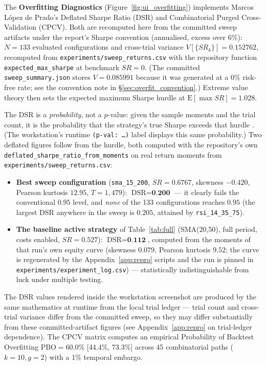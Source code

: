 \documentclass[12pt,a4paper,oneside]{report}
\begin{document}
The \textbf{Overfitting Diagnostics} (Figure~\ref{fig:ui_overfitting}) implements Marcos L{\'o}pez de Prado's Deflated Sharpe Ratio (DSR) and Combinatorial Purged Cross-Validation (CPCV). Both are recomputed here from the committed sweep artifacts under the report's Sharpe convention (annualised, excess over 6\%): $N = 133$ evaluated configurations and cross-trial variance $V[\{SR_k\}] = 0.152762$, recomputed from \texttt{experiments/\allowbreak sweep\_returns.csv} with the repository function \texttt{expected\_max\_sharpe} at benchmark $SR = 0$. (The committed \texttt{sweep\_summary.json} stores $V = 0.085991$ because it was generated at a 0\% risk-free rate; see the convention note in \S\ref{sec:overfit_convention}.) Extreme value theory then sets the expected maximum Sharpe hurdle at $\text{E}[\max SR] = 1.028$. \par
The DSR is a \emph{probability}, not a $p$-value: given the sample moments and the trial count, it is the probability that the strategy's true Sharpe exceeds that hurdle \cite{bailey2014}. (The workstation's runtime \texttt{(p-val:\,\ldots)} label displays this same probability.) Two deflated figures follow from the hurdle, both computed with the repository's own \texttt{deflated\_sharpe\_ratio\_from\_moments} on real return moments from \texttt{experiments/sweep\_returns.csv}:

\begin{itemize}[leftmargin=1.2cm]
    \item \textbf{Best sweep configuration} (\texttt{sma\_15\_200}, $SR = 0.6767$, skewness $-0.420$, Pearson kurtosis $12.95$, $T = 1{,}479$): $\text{DSR} = \textbf{0.200}$ --- it clearly fails the conventional $0.95$ level, and \emph{none} of the 133 configurations reaches $0.95$ (the largest DSR anywhere in the sweep is $0.205$, attained by \texttt{rsi\_14\_35\_75}).
    \item \textbf{The baseline active strategy} of Table~\ref{tab:full} (SMA(20,50), full period, costs enabled, $SR = 0.527$): $\text{DSR} = \textbf{0.112}$, computed from the moments of that run's own equity curve (skewness $0.079$, Pearson kurtosis $9.52$; the curve is regenerated by the Appendix~\ref{app:repro} scripts and the run is pinned in \texttt{experiments/experiment\_log.csv}) --- statistically indistinguishable from luck under multiple testing.
\end{itemize}

The DSR values rendered inside the workstation screenshot are produced by the same mathematics at runtime from the local trial ledger --- trial count and cross-trial variance differ from the committed sweep, so they may differ substantially from these committed-artifact figures (see Appendix~\ref{app:repro} on trial-ledger dependence). The CPCV matrix computes an empirical Probability of Backtest Overfitting $\text{PBO} = 60.0\%$ [44.4\%, 73.3\%] across 45 combinatorial paths ($k=10, g=2$) with a 1\% temporal embargo.
\end{document}
